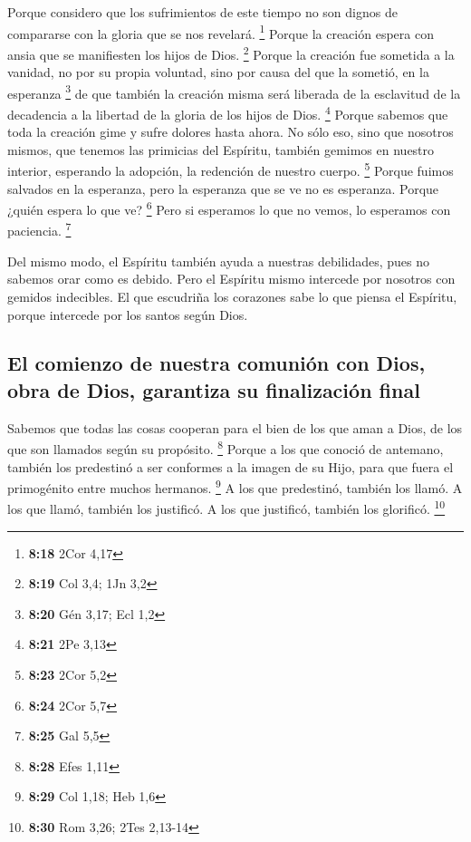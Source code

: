  Porque considero que los sufrimientos de este tiempo no
son dignos de compararse con la gloria que se nos revelará. \footnote{\textbf{8:18}
  2Cor 4,17}  Porque la creación espera con ansia que se
manifiesten los hijos de Dios. \footnote{\textbf{8:19} Col 3,4; 1Jn 3,2}
 Porque la creación fue sometida a la vanidad, no por su
propia voluntad, sino por causa del que la sometió, en la esperanza
\footnote{\textbf{8:20} Gén 3,17; Ecl 1,2}  de que
también la creación misma será liberada de la esclavitud de la
decadencia a la libertad de la gloria de los hijos de Dios. \footnote{\textbf{8:21}
  2Pe 3,13}  Porque sabemos que toda la creación gime y
sufre dolores hasta ahora.  No sólo eso, sino que
nosotros mismos, que tenemos las primicias del Espíritu, también gemimos
en nuestro interior, esperando la adopción, la redención de nuestro
cuerpo. \footnote{\textbf{8:23} 2Cor 5,2}  Porque fuimos
salvados en la esperanza, pero la esperanza que se ve no es esperanza.
Porque ¿quién espera lo que ve? \footnote{\textbf{8:24} 2Cor 5,7}
 Pero si esperamos lo que no vemos, lo esperamos con
paciencia. \footnote{\textbf{8:25} Gal 5,5}

 Del mismo modo, el Espíritu también ayuda a nuestras
debilidades, pues no sabemos orar como es debido. Pero el Espíritu mismo
intercede por nosotros con gemidos indecibles.  El que
escudriña los corazones sabe lo que piensa el Espíritu, porque intercede
por los santos según Dios.

\hypertarget{el-comienzo-de-nuestra-comuniuxf3n-con-dios-obra-de-dios-garantiza-su-finalizaciuxf3n-final}{%
\subsection{El comienzo de nuestra comunión con Dios, obra de Dios,
garantiza su finalización
final}\label{el-comienzo-de-nuestra-comuniuxf3n-con-dios-obra-de-dios-garantiza-su-finalizaciuxf3n-final}}

 Sabemos que todas las cosas cooperan para el bien de los
que aman a Dios, de los que son llamados según su propósito. \footnote{\textbf{8:28}
  Efes 1,11}  Porque a los que conoció de antemano,
también los predestinó a ser conformes a la imagen de su Hijo, para que
fuera el primogénito entre muchos hermanos. \footnote{\textbf{8:29} Col
  1,18; Heb 1,6}  A los que predestinó, también los
llamó. A los que llamó, también los justificó. A los que justificó,
también los glorificó. \footnote{\textbf{8:30} Rom 3,26; 2Tes 2,13-14}

